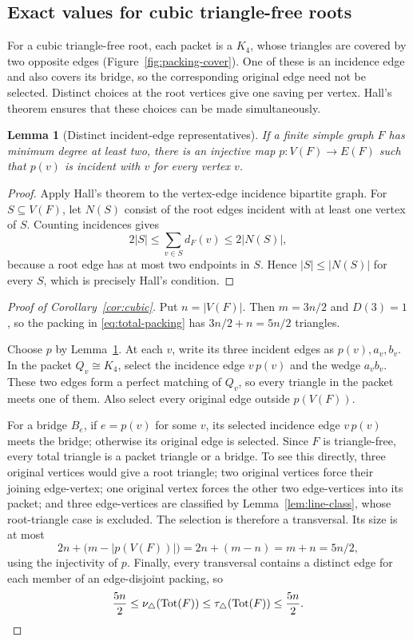 \documentclass[11pt]{article}
\newtheorem{lemma}[theorem]{Lemma}
\theoremstyle{remark}
\newcommand{\tri}{\triangle}
\newcommand{\Tot}{\operatorname{Tot}}
\begin{document}
\subsection{Exact values for cubic triangle-free roots}\label{sec:triangle-free}

For a cubic triangle-free root, each packet is a $K_4$, whose triangles
are covered by two opposite edges (Figure~\ref{fig:packing-cover}).  One
of these is an incidence edge and also covers its bridge, so the
corresponding original edge need not be selected.  Distinct choices at the
root vertices give one saving per vertex.  Hall's theorem ensures that
these choices can be made simultaneously.

\begin{lemma}[Distinct incident-edge representatives]\label{lem:hall}
If a finite simple graph $F$ has minimum degree at least two, there is an
injective map $p:V(F)\longrightarrow E(F)$ such that $p(v)$ is incident
with $v$ for every vertex $v$.
\end{lemma}

\begin{proof}
Apply Hall's theorem to the vertex-edge incidence bipartite graph.  For
$S\subseteq V(F)$, let $N(S)$ consist of the root edges incident with at
least one vertex of $S$.  Counting incidences gives
\[
  2|S|\leq\sum_{v\in S}d_F(v)\leq2|N(S)|,
\]
because a root edge has at most two endpoints in $S$.  Hence
$|S|\leq|N(S)|$ for every $S$, which is precisely Hall's condition.
\end{proof}

\begin{proof}[Proof of Corollary~\ref{cor:cubic}]
Put $n=|V(F)|$.  Then $m=3n/2$ and $D(3)=1$, so the packing in
\eqref{eq:total-packing} has $3n/2+n=5n/2$ triangles.

Choose $p$ by Lemma~\ref{lem:hall}.  At each $v$, write its three incident
edges as $p(v),a_v,b_v$.  In the packet $Q_v\cong K_4$, select the
incidence edge $v\,p(v)$ and the wedge $a_vb_v$.  These two edges form a
perfect matching of $Q_v$, so every triangle in the packet meets one of
them.  Also select every original edge outside $p(V(F))$.

For a bridge $B_e$, if $e=p(v)$ for some $v$, its selected incidence edge
$v\,p(v)$ meets the bridge; otherwise its original edge is selected.
Since $F$ is triangle-free, every total triangle is a packet triangle or a
bridge.  To see this directly, three original vertices would give a root
triangle; two original vertices force their joining edge-vertex; one
original vertex forces the other two edge-vertices into its packet; and
three edge-vertices are classified by Lemma~\ref{lem:line-class}, whose
root-triangle case is excluded.  The selection is therefore a transversal.  Its
size is at most
\[
  2n+\bigl(m-|p(V(F))|\bigr)=2n+(m-n)=m+n=5n/2,
\]
using the injectivity of $p$.  Finally, every transversal contains a
distinct edge for each member of an edge-disjoint packing, so
\[
  \frac{5n}{2}\leq\nu_\tri(\Tot(F))
  \leq\tau_\tri(\Tot(F))\leq\frac{5n}{2}.\qedhere
\]
\end{proof}
\end{document}
